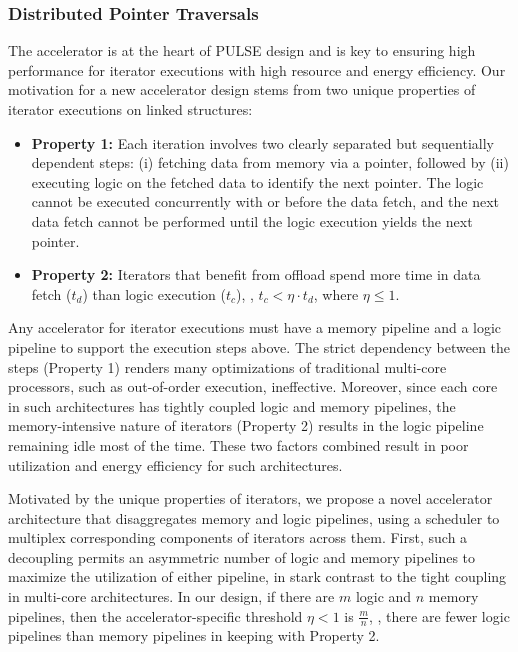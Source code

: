 \subsubsection{Distributed Pointer Traversals}
The accelerator is at the heart of PULSE design and is key to ensuring high performance for iterator executions with high resource and energy efficiency. Our motivation for a new accelerator design stems from two unique properties of iterator executions on linked structures:

\begin{itemize}[leftmargin=*, itemsep=0pt] \item \textbf{Property 1:} Each iteration involves two clearly separated but sequentially dependent steps: (i) fetching data from memory via a pointer, followed by (ii) executing logic on the fetched data to identify the next pointer. The logic cannot be executed concurrently with or before the data fetch, and the next data fetch cannot be performed until the logic execution yields the next pointer. \item \textbf{Property 2:} Iterators that benefit from offload spend more time in data fetch ($t_d$) than logic execution ($t_c$), \ie, $t_c < \eta \cdot t_d$, where $\eta \leq 1$. \end{itemize}

Any accelerator for iterator executions must have a memory pipeline and a logic pipeline to support the execution steps above. The strict dependency between the steps (Property 1) renders many optimizations of traditional multi-core processors, such as out-of-order execution, ineffective. Moreover, since each core in such architectures has tightly coupled logic and memory pipelines, the memory-intensive nature of iterators (Property 2) results in the logic pipeline remaining idle most of the time. These two factors combined result in poor utilization and energy efficiency for such architectures.

 Motivated by the unique properties of iterators, we propose a novel accelerator architecture that disaggregates memory and logic pipelines, using a scheduler to multiplex corresponding components of iterators across them. First, such a decoupling permits an asymmetric number of logic and memory pipelines to maximize the utilization of either pipeline, in stark contrast to the tight coupling in multi-core architectures. In our design, if there are $m$ logic and $n$ memory pipelines, then the accelerator-specific threshold $\eta < 1$ is $\frac{m}{n}$, \ie, there are fewer logic pipelines than memory pipelines in keeping with Property 2.

